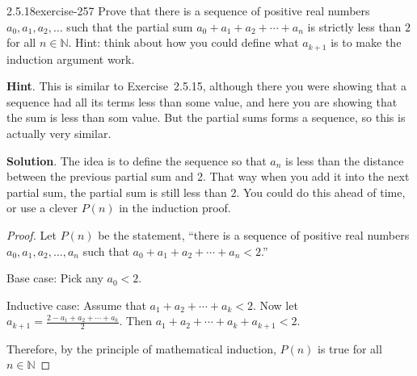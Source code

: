\documentclass[twoside,11pt,]{book}
\numberwithin{equation}{chapter}
\newcommand{\N}{\mathbb N}
\newcommand{\lt}{<}
\begin{document}
\begin{divisionsolution}{2.5.18}{}{exercise-257}%
\hypertarget{p-3654}{}%
Prove that there is a sequence of positive real numbers \(a_0, a_1, a_2, \ldots\) such that the partial sum \(a_0 + a_1 + a_2 + \cdots + a_n\) is strictly less than \(2\) for all \(n \in \N\). Hint: think about how you could define what \(a_{k+1}\) is to make the induction argument work.%
\par\smallskip%
\noindent\textbf{Hint}.\quad%
\hypertarget{p-3655}{}%
This is similar to Exercise~2.5.15, although there you were showing that a sequence had all its terms less than some value, and here you are showing that the sum is less than som value.  But the partial sums forms a sequence, so this is actually very similar.%
\par\smallskip%
\noindent\textbf{Solution}.\quad%
\hypertarget{p-3656}{}%
The idea is to define the sequence so that \(a_n\) is less than the distance between the previous partial sum and 2. That way when you add it into the next partial sum, the partial sum is still less than 2. You could do this ahead of time, or use a clever \(P(n)\) in the induction proof.%
\begin{proof}{}
\hypertarget{p-3657}{}%
Let \(P(n)\) be the statement, ``there is a sequence of positive real numbers \(a_0, a_1, a_2, \ldots,
a_n\) such that \(a_0 + a_1 + a_2 + \cdots + a_n \lt 2\).''%
\par
\hypertarget{p-3658}{}%
Base case: Pick any \(a_0 \lt 2\).%
\par
\hypertarget{p-3659}{}%
Inductive case: Assume that \(a_1 + a_2 + \cdots + a_k \lt 2\). Now let \(a_{k+1} = \frac{2- a_1 + a_2 + \cdots + a_k}{2}\). Then \(a_1 + a_2 + \cdots +a_k + a_{k+1} \lt 2\).%
\par
\hypertarget{p-3660}{}%
Therefore, by the principle of mathematical induction, \(P(n)\) is true for all \(n \in \N\)%
\end{proof}
\end{divisionsolution}%
\end{document}
